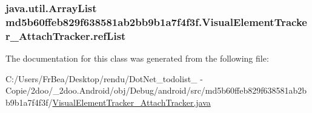 \hypertarget{classmd5b60ffeb829f638581ab2bb9b1a7f4f3f_1_1_visual_element_tracker___attach_tracker_54dbcf5c7b4ceea634f9e3f1995dccb1}{
\subsubsection[{refList}]{\setlength{\rightskip}{0pt plus 5cm}java.util.ArrayList {\bf md5b60ffeb829f638581ab2bb9b1a7f4f3f.VisualElementTracker\_\-AttachTracker.refList}}}
\label{classmd5b60ffeb829f638581ab2bb9b1a7f4f3f_1_1_visual_element_tracker___attach_tracker_54dbcf5c7b4ceea634f9e3f1995dccb1}




The documentation for this class was generated from the following file:\begin{CompactItemize}
\item 
C:/Users/FrBea/Desktop/rendu/DotNet\_\-todolist\_ - Copie/2doo/\_\-2doo.Android/obj/Debug/android/src/md5b60ffeb829f638581ab2bb9b1a7f4f3f/\hyperlink{_visual_element_tracker___attach_tracker_8java}{VisualElementTracker\_\-AttachTracker.java}\end{CompactItemize}
